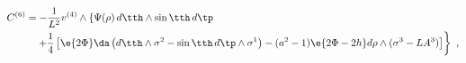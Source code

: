 \begin{equation}
\label{C6}
\begin{split}
  C^{(6)} &= -\frac1{L^2} v^{(4)} \wedge \left\{ 
  \Psi(\rho)\, d\tth \wedge \sin\tth\, d\tp \right. \\
  &\quad \left. + \frac14 \left[ 
  \e{2\Phi} \da \left( d\tth \wedge \sigma^2 - \sin \tth\, d\tp \wedge
  \sigma^1 \right) 
  - (a^2-1) \e{2\Phi-2h} d\rho \wedge (\sigma^3 -L A^3) \right]
  \right\}~, 
\end{split}
\end{equation} 
